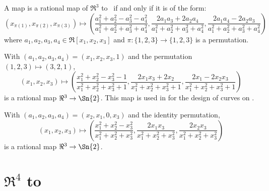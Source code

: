 \begin{theorem}
\label{thm:n3}
A map is a rational map of $\Re^3$ to \ if and only if
it is of the form:
\[
(x_{\pi(1)},x_{\pi(2)},x_{\pi(3)}) \mapsto (\frac{a_1^2 + a_2^2 - a_3^2 - a_4^2}{a_1^2 + a_2^2 + a_3^2 + a_4^2},
		       \frac{2a_1a_3 + 2a_2a_4}{a_1^2 + a_2^2 + a_3^2 + a_4^2},
		       \frac{2a_1a_4 - 2a_2a_3}{a_1^2 + a_2^2 + a_3^2 + a_4^2})
\]
where $a_1,a_2,a_3,a_4 \in \Re[x_1,x_2,x_3]$
and $\pi : \{1,2,3\} \rightarrow \{1,2,3\}$ is a permutation.
\end{theorem}
%
\begin{example}
With $(a_1,a_2,a_3,a_4) = (x_1,x_2,x_3,1)$
and the permutation $(1,2,3) \mapsto (3,2,1)$,
\[
(x_1,x_2,x_3) \mapsto 
(\frac{x_1^2 + x_2^2 - x_3^2 - 1}{x_1^2 + x_2^2 + x_3^2 + 1},
 \frac{2x_1x_3 + 2x_2}{x_1^2 + x_2^2 + x_3^2 + 1},
 \frac{2x_1 - 2x_2x_3}{x_1^2 + x_2^2 + x_3^2 + 1})
\]
is a rational map $\Re^3 \rightarrow \Sn{2}$.
This map is used in \cite{dietz93} 
for the design of curves on .
\end{example}
%
\begin{example}
\label{eg:foreshadow}
With $(a_1,a_2,a_3,a_4)=(x_2,x_1,0,x_3)$ and the identity permutation,
\[
(x_1,x_2,x_3) \mapsto 
(\frac{x_1^2 + x_2^2 - x_3^2}{x_1^2 + x_2^2 + x_3^2},
 \frac{2x_1x_3}{x_1^2 + x_2^2 + x_3^2},
 \frac{2x_2x_3}{x_1^2 + x_2^2 + x_3^2})
\]
is a rational map $\Re^3 \rightarrow \Sn{2}$.
\end{example}

\vspace{.5in}

\section{$\Re^{4}$ to }
\label{sec:n4}

